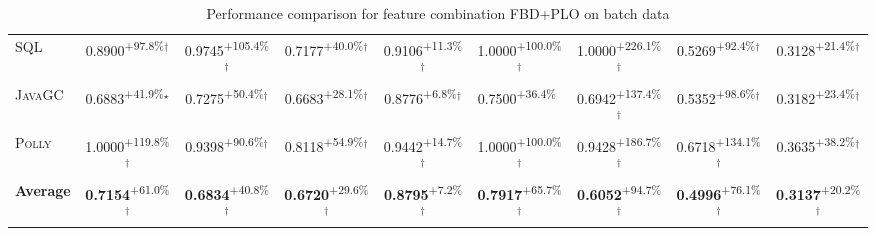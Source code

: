 \begin{table}[htbp]
\begin{tabular}{l|cccc|cccc}
\textsc{SQL} & \cellcolor{green!30}0.8900\textsuperscript{+97.8\%}$^\dagger$ & \cellcolor{green!30}0.9745\textsuperscript{+105.4\%}$^\dagger$ & \cellcolor{green!30}0.7177\textsuperscript{+40.0\%}$^\dagger$ & \cellcolor{green!30}0.9106\textsuperscript{+11.3\%}$^\dagger$ & \cellcolor{green!30}1.0000\textsuperscript{+100.0\%}$^\dagger$ & \cellcolor{green!30}1.0000\textsuperscript{+226.1\%}$^\dagger$ & \cellcolor{green!30}0.5269\textsuperscript{+92.4\%}$^\dagger$ & \cellcolor{green!30}0.3128\textsuperscript{+21.4\%}$^\dagger$ \\
\textsc{JavaGC} & \cellcolor{green!30}0.6883\textsuperscript{+41.9\%}$^\star$ & \cellcolor{green!30}0.7275\textsuperscript{+50.4\%}$^\dagger$ & \cellcolor{green!30}0.6683\textsuperscript{+28.1\%}$^\dagger$ & \cellcolor{green!30}0.8776\textsuperscript{+6.8\%}$^\dagger$ & \cellcolor{green!30}0.7500\textsuperscript{+36.4\%}$^{\,\,\,}$ & \cellcolor{green!30}0.6942\textsuperscript{+137.4\%}$^\dagger$ & \cellcolor{green!30}0.5352\textsuperscript{+98.6\%}$^\dagger$ & \cellcolor{green!30}0.3182\textsuperscript{+23.4\%}$^\dagger$ \\
\textsc{Polly} & \cellcolor{green!30}1.0000\textsuperscript{+119.8\%}$^\dagger$ & \cellcolor{green!30}0.9398\textsuperscript{+90.6\%}$^\dagger$ & \cellcolor{green!30}0.8118\textsuperscript{+54.9\%}$^\dagger$ & \cellcolor{green!30}0.9442\textsuperscript{+14.7\%}$^\dagger$ & \cellcolor{green!30}1.0000\textsuperscript{+100.0\%}$^\dagger$ & \cellcolor{green!30}0.9428\textsuperscript{+186.7\%}$^\dagger$ & \cellcolor{green!30}0.6718\textsuperscript{+134.1\%}$^\dagger$ & \cellcolor{green!30}0.3635\textsuperscript{+38.2\%}$^\dagger$ \\
\hline
\textbf{Average} & \cellcolor{green!30}\textbf{0.7154}\textsuperscript{+61.0\%}$^\dagger$ & \cellcolor{green!30}\textbf{0.6834}\textsuperscript{+40.8\%}$^\dagger$ & \cellcolor{green!30}\textbf{0.6720}\textsuperscript{+29.6\%}$^\dagger$ & \cellcolor{green!30}\textbf{0.8795}\textsuperscript{+7.2\%}$^\dagger$ & \cellcolor{green!30}\textbf{0.7917}\textsuperscript{+65.7\%}$^\dagger$ & \cellcolor{green!30}\textbf{0.6052}\textsuperscript{+94.7\%}$^\dagger$ & \cellcolor{green!30}\textbf{0.4996}\textsuperscript{+76.1\%}$^\dagger$ & \cellcolor{green!30}\textbf{0.3137}\textsuperscript{+20.2\%}$^\dagger$ \\
\hline
\end{tabular}
\caption{Performance comparison for feature combination FBD+PLO on batch data}
\label{tab:combo_FBD_PLO_performance_batch}
\end{table}